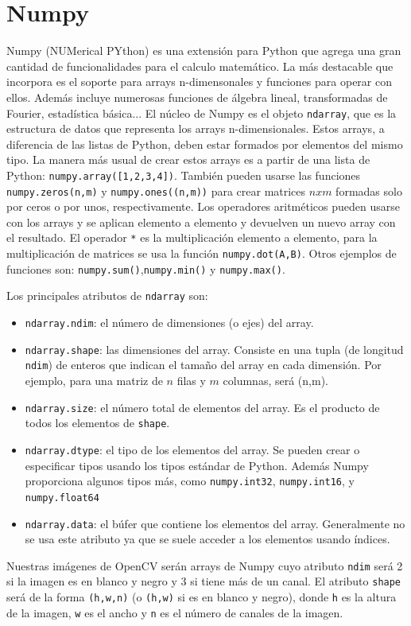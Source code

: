 \documentclass[a4paper,openright, 12pt]{book}
\begin{document}
\section{Numpy}
Numpy (NUMerical PYthon) es una extensión para Python que agrega una gran cantidad de funcionalidades para el calculo matemático. La más destacable que incorpora es el soporte para arrays n-dimensonales y funciones para operar con ellos. Además incluye numerosas funciones de álgebra lineal, transformadas de Fourier, estadística básica...
\newline
El núcleo de Numpy es el objeto \lstinline|ndarray|, que es la estructura de datos que representa los arrays n-dimensionales. Estos arrays, a diferencia de las listas de Python, deben estar formados por elementos del mismo tipo.
La manera más usual de crear estos arrays es a partir de una lista de Python: \lstinline|numpy.array([1,2,3,4])|. También pueden usarse las funciones \lstinline|numpy.zeros(n,m)| y \lstinline|numpy.ones((n,m))| para crear matrices $nxm$ formadas solo por ceros o por unos, respectivamente.
\newline
Los operadores aritméticos pueden usarse con los arrays y se aplican elemento a elemento y devuelven un nuevo array con el resultado.
El operador \lstinline|*| es la multiplicación elemento a elemento, para la multiplicación de matrices se usa la función \lstinline|numpy.dot(A,B)|.
Otros ejemplos de funciones son: \lstinline|numpy.sum()|,\lstinline|numpy.min()| y \lstinline|numpy.max()|.

Los principales atributos de \lstinline|ndarray| son:
 \begin{itemize}
\item \lstinline|ndarray.ndim|: el número de dimensiones (o ejes) del array.
 
\item \lstinline|ndarray.shape|: las dimensiones del array. Consiste en una tupla (de longitud \lstinline|ndim|) de enteros que indican el tamaño del array en cada dimensión. Por ejemplo, para una matriz de $n$ filas y $m$ columnas, será (n,m).

\item  \lstinline|ndarray.size|: el número total de elementos del array. Es el producto de todos los elementos de \lstinline|shape|. 

\item\lstinline|ndarray.dtype|: el tipo de los elementos del array. Se pueden crear o especificar tipos usando los tipos estándar de Python. Además Numpy proporciona algunos tipos más, como \lstinline|numpy.int32|, \lstinline|numpy.int16|, y \lstinline|numpy.float64|

\item \lstinline|ndarray.data|: el búfer que contiene los elementos del array. Generalmente no se usa este atributo ya que se suele acceder a los elementos usando índices.
 \end{itemize}
Nuestras imágenes de OpenCV serán arrays de Numpy cuyo atributo \lstinline|ndim| será 2 si la imagen es en blanco y negro y 3 si tiene más de un canal.
El atributo \lstinline|shape| será de la forma \lstinline|(h,w,n)| (o \lstinline|(h,w)| si es en blanco y negro), donde \lstinline|h| es la altura de la imagen, \lstinline|w| es el ancho y \lstinline|n| es el número de canales de la imagen.
\end{document}
